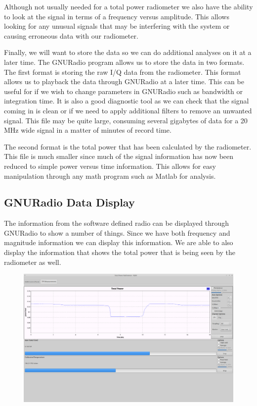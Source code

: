Although not usually needed for a total power radiometer we also have the ability to look at the signal in terms of a frequency versus amplitude.  This allows looking for any unusual signals that may be interfering with the system or causing erroneous data with our radiometer.  

Finally, we will want to store the data so we can do additional analyses on it at a later time.  The GNURadio program allows us to store the data in two formats.  The first format is storing the raw I/Q data from the radiometer.  This format allows us to playback the data through GNURadio at a later time.  This can be useful for if we wish to change parameters in GNURadio such as bandwidth or integration time.  It is also a good diagnostic tool as we can check that the signal coming in is clean or if we need to apply additional filters to remove an unwanted signal. This file may be quite large, consuming several gigabytes of data for a 20 MHz wide signal in a matter of minutes of record time.

The second format is the total power that has been calculated by the radiometer.  This file is much smaller since much of the signal information has now been reduced to simple power versus time information.  This allows for easy manipulation through any math program such as Matlab for analysis.  

\subsection{GNURadio Data Display}
The information from the software defined radio can be displayed through GNURadio to show a number of things.  Since we have both frequency and magnitude information we can display this information.  We are able to also display the information that shows the total power that is being seen by the radiometer as well.

{\begin{figure}[h!tb] 
\centering
\includegraphics[width=17cm]{Images/Lab1_TPR_at_end_exp.png}
\label{radiometer_tpr_display}
\end{figure}
}

